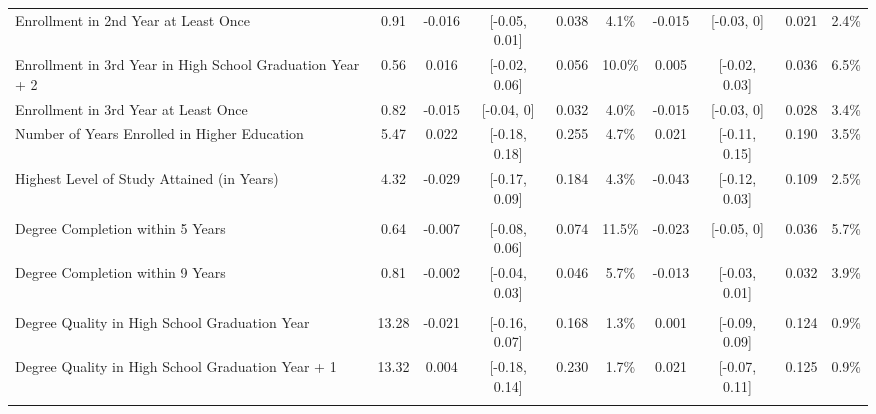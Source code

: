\begin{table}[H]
{\begin{threeparttable}
\begin{tabular}[t]{lccccccccc}
\addlinespace[\smallskipamount]
\hspace{1em}Enrollment in 2nd Year at Least Once & 0.91 & -0.016 & {}[-0.05, 0.01] & 0.038 & 4.1\% & -0.015 & {}[-0.03, 0] & 0.021 & 2.4\%\\
\addlinespace[\smallskipamount]
\hspace{1em}Enrollment in 3rd Year in High School Graduation Year + 2 & 0.56 & 0.016 & {}[-0.02, 0.06] & 0.056 & 10.0\% & 0.005 & {}[-0.02, 0.03] & 0.036 & 6.5\%\\
\addlinespace[\smallskipamount]
\hspace{1em}Enrollment in 3rd Year at Least Once & 0.82 & -0.015 & {}[-0.04, 0] & 0.032 & 4.0\% & -0.015 & {}[-0.03, 0] & 0.028 & 3.4\%\\
\addlinespace[\smallskipamount]
\hspace{1em}Number of Years Enrolled in Higher Education & 5.47 & 0.022 & {}[-0.18, 0.18] & 0.255 & 4.7\% & 0.021 & {}[-0.11, 0.15] & 0.190 & 3.5\%\\
\addlinespace[\smallskipamount]
\hspace{1em}Highest Level of Study Attained (in Years) & 4.32 & -0.029 & {}[-0.17, 0.09] & 0.184 & 4.3\% & -0.043 & {}[-0.12, 0.03] & 0.109 & 2.5\%\\
\addlinespace[\smallskipamount]
\addlinespace[0.3em]
\multicolumn{10}{l}{\textit{Panel C. Degree Completion}}\\
\hspace{1em}Degree Completion within 5 Years & 0.64 & -0.007 & {}[-0.08, 0.06] & 0.074 & 11.5\% & -0.023 & {}[-0.05, 0] & 0.036 & 5.7\%\\
\addlinespace[\smallskipamount]
\hspace{1em}Degree Completion within 9 Years & 0.81 & -0.002 & {}[-0.04, 0.03] & 0.046 & 5.7\% & -0.013 & {}[-0.03, 0.01] & 0.032 & 3.9\%\\
\addlinespace[\smallskipamount]
\addlinespace[0.3em]
\multicolumn{10}{l}{\textit{Panel D. Degree Quality}}\\
\hspace{1em}Degree Quality in High School Graduation Year & 13.28 & -0.021 & {}[-0.16, 0.07] & 0.168 & 1.3\% & 0.001 & {}[-0.09, 0.09] & 0.124 & 0.9\%\\
\addlinespace[\smallskipamount]
\hspace{1em}Degree Quality in High School Graduation Year + 1 & 13.32 & 0.004 & {}[-0.18, 0.14] & 0.230 & 1.7\% & 0.021 & {}[-0.07, 0.11] & 0.125 & 0.9\%\\
\addlinespace[\smallskipamount]

\end{tabular}
\end{threeparttable}}
\end{table}
